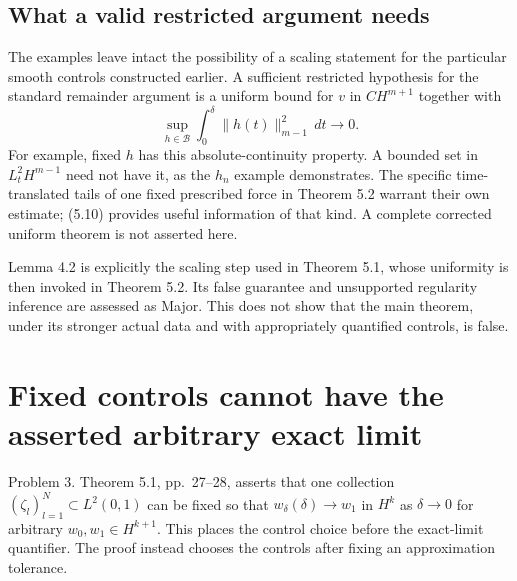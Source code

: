 \documentclass[10pt]{article}
\begin{document}
\subsection*{What a valid restricted argument needs}
The examples leave intact the possibility of a scaling statement for the particular smooth controls constructed earlier. A sufficient restricted hypothesis for the standard remainder argument is a uniform bound for \(v\) in \(C H^{m+1}\) together with \[\sup_{h\in\mathcal B}
 \int_0^\delta\|h(t)\|_{m-1}^2\,dt\longrightarrow0 .\] For example, fixed \(h\) has this absolute-continuity property. A bounded set in \(L^2_tH^{m-1}\) need not have it, as the \(h_n\) example demonstrates. The specific time-translated tails of one fixed prescribed force in Theorem 5.2 warrant their own estimate; (5.10) provides useful information of that kind. A complete corrected uniform theorem is not asserted here.\par
Lemma 4.2 is explicitly the scaling step used in Theorem 5.1, whose uniformity is then invoked in Theorem 5.2. Its false guarantee and unsupported regularity inference are assessed as Major. This does not show that the main theorem, under its stronger actual data and with appropriately quantified controls, is false.\par
\section*{Fixed controls cannot have the asserted arbitrary exact limit}
Problem 3.  Theorem 5.1, pp. 27–28, asserts that one collection \((\zeta_l)_{l=1}^N\subset L^2(0,1)\) can be fixed so that \(w_\delta(\delta)\to w_1\) in \(H^k\) as \(\delta\to0\) for arbitrary \(w_0,w_1\in H^{k+1}\). This places the control choice before the exact-limit quantifier. The proof instead chooses the controls after fixing an approximation tolerance.\par
\end{document}

